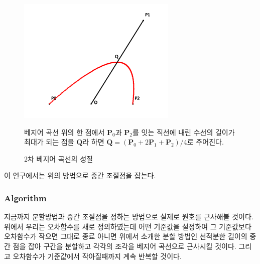 \documentclass{gshs_thesis}
\theoremstyle{theorem}
\theoremstyle{lemma}
\theoremstyle{definition}
\begin{document}
\begin{figure}[h]
	\centering
	\includegraphics[width=.5\textwidth]{image/BCmiddle}
	\caption{2차 베지어 곡선의 성질}
	\raggedright \small 베지어 곡선 위의 한 점에서 $\textbf{P}_{0}$과 $\textbf{P}_{2}$를 잇는 직선에 내린 수선의 길이가 최대가 되는 점을 $\textbf{Q}$라 하면 $\textbf{Q}=(\textbf{P}_{0}+2\textbf{P}_{1}+\textbf{P}_{2})/4$로 주어진다.
\end{figure}
이 연구에서는 위의 방법으로 중간 조절점을 잡는다. 
\subsubsection{Algorithm} \label{arc_approxiamtion}
지금까지 분할방법과 중간 조절점을 정하는 방법으로 실제로 원호를 근사해볼 것이다.
위에서 우리는 오차함수를 새로 정의하였는데 어떤 기준값을 설정하여 그 기준값보다 오차함수가 작으면 그대로 종료 아니면 위에서 소개한 분할 방법인 선적분한 길이의 중간 점을 잡아 구간을 분할하고 각각의 조각을 베지어 곡선으로 근사시킬 것이다. 그리고 오차함수가 기준값에서 작아질때까지 계속 반복할 것이다.
\end{document}
